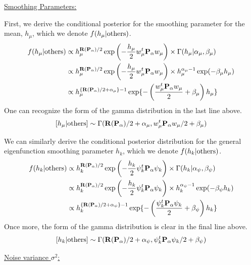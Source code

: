 \documentclass[12pt]{article}
\begin{document}
\vspace{0.5em}
\underline{Smoothing Parameters:}

First, we derive the conditional posterior for the smoothing parameter for the mean, $h_\mu$, which we denote $f(h_\mu|{\rm others})$.
\begin{align*}
    f(h_{\mu}|{\rm others}) & \propto h_\mu^{\mathbf{R}(\mathbf{P}_\alpha)/2}\exp\left(-\frac{h_{\mu}}{2} w^t_{\mu}\mathbf{P}_{\alpha} w_{\mu}\right) \times \Gamma(h_\mu|\alpha_\mu,\beta_\mu)\\
    & \propto h_\mu^{\mathbf{R}(\mathbf{P}_\alpha)/2}\exp\left(-\frac{h_{\mu}}{2} w^t_{\mu}\mathbf{P}_{\alpha} w_{\mu}\right) \times  h_{\mu}^{\alpha_\mu - 1} \exp(-\beta_\mu h_{\mu})\\
    & \propto h_{\mu}^{\{\mathbf{R}(\mathbf{P}_\alpha)/2 + \alpha_\mu\} - 1} \exp\{-\left(\frac{w_{\mu}^t\mathbf{P}_\alpha w_{\mu}}{2} + \beta_\mu\right) h_{\mu}\}
\end{align*}
One can recognize the form of the gamma distribution in the last line above.
$$[h_\mu|{\rm others}] \sim \Gamma(\mathbf{R}(\mathbf{P}_\alpha)/2 + \alpha_\mu, w_{\mu}^t\mathbf{P}_\alpha w_{\mu}/2 + \beta_\mu)$$

We can similarly derive the conditional posterior distribution for the general eigenfunction smoothing parameter $h_k$, which we denote $f(h_k|{\rm others})$.
\begin{align*}
    f(h_{k}|{\rm others}) & \propto h_k^{\mathbf{R}(\mathbf{P}_\alpha)/2}\exp\left(-\frac{h_k}{2}\psi_k^t\mathbf{P}_{\alpha}\psi_k\right) \times \Gamma(h_k|\alpha_\psi, \beta_\psi)\\
    & \propto h_k^{\mathbf{R}(\mathbf{P}_\alpha)/2}\exp\left(-\frac{h_k}{2}\psi_k^t\mathbf{P}_{\alpha}\psi_k\right) \times h_{k}^{\alpha_\psi - 1} \exp(-\beta_\psi h_{k})\\
    & \propto h_{k}^{\{\mathbf{R}(\mathbf{P}_\alpha)/2 + \alpha_\psi\} - 1} \exp\{-\left(\frac{\psi_k^t\mathbf{P}_\alpha \psi_k}{2} + 
    \beta_\psi\right)h_{k}\}
\end{align*}
Once more, the form of the gamma distribution is clear in the final line above.
$$[h_k|{\rm others}] \sim \Gamma(\mathbf{R}(\mathbf{P}_\alpha)/2 + \alpha_\psi, \psi_k^t \mathbf{P}_\alpha \psi_k/2 + \beta_\psi)$$

\vspace{0.5em}
\underline{Noise variance $\sigma^2$:}
\end{document}
